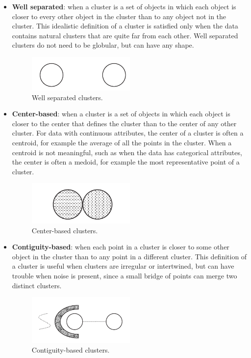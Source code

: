 \documentclass[12pt,a4paper,cucitura]{toptesi}
\begin{document}
\begin{itemize}
\item \textbf{Well separated}: when a cluster is a set of objects in which each object is closer to every other object in the cluster than to any object not in the cluster.
This idealistic definition of a cluster is satisfied only when the data contains natural clusters that are quite far from each other.
Well separated clusters do not need to be globular, but can have any shape.

\begin{figure}
\centering
\includegraphics[width=0.5\textwidth]{clusters-well.png}
\caption{Well separated clusters.}
\end{figure}

\item \textbf{Center-based}: when a cluster is a set of objects in which each object is closer to the center that defines the cluster than to the center of any other cluster.
For data with continuous attributes, the center of a cluster is often a centroid, for example the average of all the points in the cluster.
When a centroid is not meaningful, such as when the data has categorical attributes, the center is often a medoid, for example the most representative point of a cluster.

\begin{figure}
\centering
\includegraphics[width=0.5\textwidth]{clusters-center.png}
\caption{Center-based clusters.}
\end{figure}

\item \textbf{Contiguity-based}: when each point in a cluster is closer to some other object in the cluster than to any point in a different cluster.
This definition of a cluster is useful when clusters are irregular or intertwined, but can have trouble when noise is present, since a small bridge of
points can merge two distinct clusters.

\begin{figure}
\centering
\includegraphics[width=0.5\textwidth]{clusters-contiguity.png}
\caption{Contiguity-based clusters.}
\end{figure}


\end{itemize}
\end{document}
